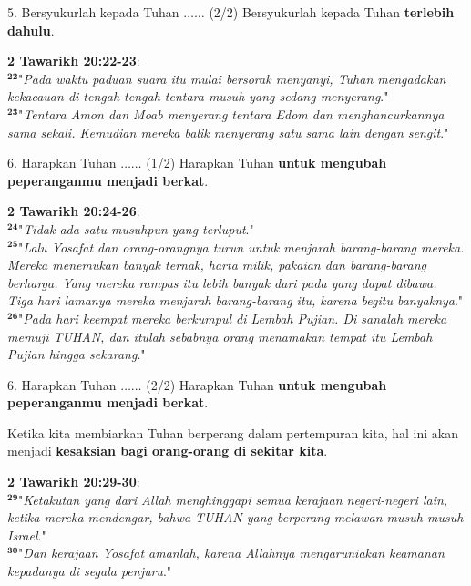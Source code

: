 \documentclass[pdf]{beamer}
\theoremstyle{mystyle}
\begin{document}
\begin{frame}{5. Bersyukurlah kepada Tuhan $\ldots \ldots$ (2/2)}
	Bersyukurlah kepada Tuhan \textbf{terlebih dahulu}.
	
	\bigskip
	\textbf{2 Tawarikh 20:22-23}: \\
	 $^{\bm{22}}$"\textit{Pada waktu paduan suara itu mulai bersorak menyanyi, Tuhan mengadakan kekacauan di tengah-tengah tentara musuh yang sedang menyerang}." \\
	 $^{\bm{23}}$"\textit{Tentara Amon dan Moab menyerang tentara Edom dan menghancurkannya sama sekali. Kemudian mereka balik menyerang satu sama lain dengan sengit}."	 	 	 
\end{frame}

\begin{frame}{6. Harapkan Tuhan $\ldots \ldots$ (1/2)}
	Harapkan Tuhan \textbf{untuk mengubah peperanganmu menjadi berkat}.
	
	\bigskip
	\textbf{2 Tawarikh 20:24-26}: \\
	 $^{\bm{24}}$"\textit{Tidak ada satu musuhpun yang terluput}." \\
	 $^{\bm{25}}$"\textit{Lalu Yosafat dan orang-orangnya turun untuk menjarah barang-barang mereka. Mereka menemukan banyak ternak, harta milik, pakaian dan barang-barang berharga. Yang mereka rampas itu lebih banyak dari pada yang dapat dibawa. Tiga hari lamanya mereka menjarah barang-barang itu, karena begitu banyaknya}." \\
	 $^{\bm{26}}$"\textit{Pada hari keempat mereka berkumpul di Lembah Pujian. Di sanalah mereka memuji TUHAN, dan itulah sebabnya orang menamakan tempat itu Lembah Pujian hingga sekarang}."	 	 	 	 
\end{frame}

\begin{frame}{6. Harapkan Tuhan $\ldots \ldots$ (2/2)}
	Harapkan Tuhan \textbf{untuk mengubah peperanganmu menjadi berkat}.
	
	\bigskip
	Ketika kita membiarkan Tuhan berperang dalam pertempuran kita, hal ini akan menjadi \textbf{kesaksian bagi orang-orang di sekitar kita}.
			
	\bigskip
	\textbf{2 Tawarikh 20:29-30}: \\
	 $^{\bm{29}}$"\textit{Ketakutan yang dari Allah menghinggapi semua kerajaan negeri-negeri lain, ketika mereka mendengar, bahwa TUHAN yang berperang melawan musuh-musuh Israel}." \\
	 $^{\bm{30}}$"\textit{Dan kerajaan Yosafat amanlah, karena Allahnya mengaruniakan keamanan kepadanya di segala penjuru}."
\end{frame}
\end{document}
